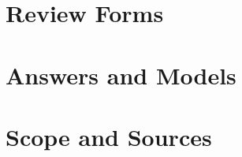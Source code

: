 \clearpage
\part{Review Forms}
\solutionsfalse
\SelectAssessments{\AssessmentSelection}


\clearpage
\part{Answers and Models}

\solutionstrue
\SelectAssessments{\AssessmentSelection}

\solutionsfalse

\clearpage
\part{Scope and Sources}



{\footnotesize\CompanionGenerationMetadata}



